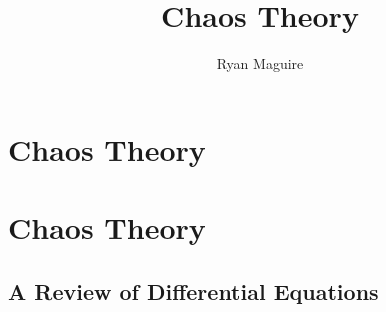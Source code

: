 \documentclass[crop=false,class=book,oneside]{standalone}
\begin{document}
    \ifx\ifmathcourses\undefined
        \title{Chaos Theory}
        \author{Ryan Maguire}
        \date{\vspace{-5ex}}
        \maketitle
        \tableofcontents
        \chapter*{Chaos Theory}
        \setcounter{chapter}{1}
    \else
        \chapter{Chaos Theory}
    \fi 
    \section{A Review of Differential Equations}
\end{document}
